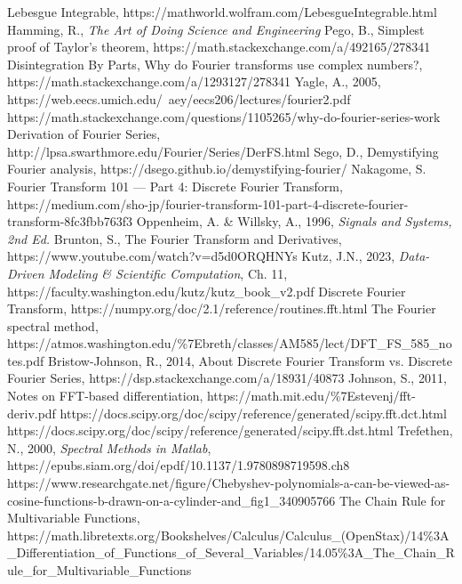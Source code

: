 \documentclass[10pt]{article}
\begin{document}
\printendnotes

\begin{thebibliography}{99} %
\raggedright 
{}
	Lebesgue Integrable, https://mathworld.wolfram.com/LebesgueIntegrable.html
	Hamming, R., \textit{The Art of Doing Science and Engineering}
	Pego, B., Simplest proof of Taylor's theorem, https://math.stackexchange.com/a/492165/278341
	Disintegration By Parts, Why do Fourier transforms use complex numbers?, https://math.stackexchange.com/a/1293127/278341
	Yagle, A., 2005, https://web.eecs.umich.edu/~aey/eecs206/lectures/fourier2.pdf
	https://math.stackexchange.com/questions/1105265/why-do-fourier-series-work
	Derivation of Fourier Series, http://lpsa.swarthmore.edu/Fourier/Series/DerFS.html
	Sego, D., Demystifying Fourier analysis, https://dsego.github.io/demystifying-fourier/
	Nakagome, S. Fourier Transform 101 — Part 4: Discrete Fourier Transform, https://medium.com/sho-jp/fourier-transform-101-part-4-discrete-fourier-transform-8fc3fbb763f3
	Oppenheim, A. \& Willsky, A., 1996, \textit{Signals and Systems, 2nd Ed.}
	Brunton, S., The Fourier Transform and Derivatives, https://www.youtube.com/watch?v=d5d0ORQHNYs
	Kutz, J.N., 2023, \textit{Data-Driven Modeling \& Scientific Computation}, Ch. 11, https://faculty.washington.edu/kutz/kutz\_book\_v2.pdf
	Discrete Fourier Transform, https://numpy.org/doc/2.1/reference/routines.fft.html
	The Fourier spectral method, https://atmos.washington.edu/\%7Ebreth/classes/AM585/lect/DFT\_FS\_585\_notes.pdf
	Bristow-Johnson, R., 2014, About Discrete Fourier Transform vs. Discrete Fourier Series, https://dsp.stackexchange.com/a/18931/40873
	Johnson, S., 2011, Notes on FFT-based differentiation, https://math.mit.edu/\%7Estevenj/fft-deriv.pdf
	https://docs.scipy.org/doc/scipy/reference/generated/scipy.fft.dct.html
	https://docs.scipy.org/doc/scipy/reference/generated/scipy.fft.dst.html
	Trefethen, N., 2000, \textit{Spectral Methods in Matlab}, https://epubs.siam.org/doi/epdf/10.1137/1.9780898719598.ch8
	https://www.researchgate.net/figure/Chebyshev-polynomials-a-can-be-viewed-as-cosine-functions-b-drawn-on-a-cylinder-and\_fig1\_340905766
	The Chain Rule for Multivariable Functions, https://math.libretexts.org/Bookshelves/Calculus/Calculus\newline\_(OpenStax)/14\%3A\_Differentiation\_of\_Functions\_of\_Several\_Variables/14.05\%3A\_The\_Chain\_Rule\_for\newline\_Multivariable\_Functions
\end{thebibliography}
\end{document}
